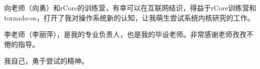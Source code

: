 \thanking


向老师（向勇）和rCore的训练营，有幸可以在互联网结识，得益于rCore训练营和tornado-os，打开了我对操作系统新的认知，让我萌生尝试系统内核研究的工作。

李老师（李丽萍），是我的专业负责人，也是我的毕设老师。非常感谢老师孜孜不倦的指导。

我自己，勇于尝试的精神。

